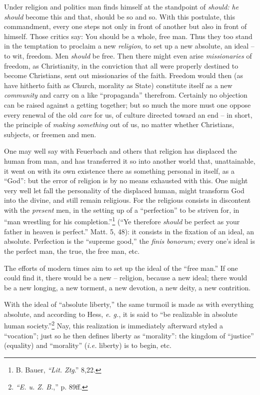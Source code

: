 \documentclass[12pt,a4paper]{book}
\begin{document}
Under religion and politics man finds himself at the standpoint of 
\textit{should: he should} become this and that, should be so and so. With 
this postulate, this commandment, every one steps not only in front of another 
but also in front of himself. Those critics say: You should be a whole, free 
man. Thus they too stand in the temptation to proclaim a new 
\textit{religion}, to set up a new absolute, an ideal -- to wit, freedom. Men 
\textit{should} be free. Then there might even arise \textit{missionaries} of 
freedom, as Christianity, in the conviction that all were properly destined to 
become Christians, sent out missionaries of the faith. Freedom would then (as 
have hitherto faith as Church, morality as State) constitute itself as a new 
\textit{community} and carry on a like ``propaganda'' therefrom. Certainly 
no objection can be raised against a getting together; but so much the more 
must one oppose every renewal of the old \textit{care} for us, of culture 
directed toward an end -- in short, the principle of \textit{making something} 
out of us, no matter whether Christians, subjects, or freemen and men.

One may well say with Feuerbach and others that religion has displaced the 
human from man, and has transferred it so into another world that, 
unattainable, it went on with its own existence there as something personal in 
itself, as a ``God'': but the error of religion is by no means exhausted 
with this. One might very well let fall the personality of the displaced 
human, might transform God into the divine, and still remain religious. For 
the religious consists in discontent with the \textit{present} men, in the 
setting up of a ``perfection'' to be striven for, in ``man wrestling for 
his completion.''\footnote{B. Bauer, \textit{``Lit. Ztg}.'' 8,22.} (``Ye 
therefore \textit{should} be perfect as your father in heaven is perfect.'' 
Matt. 5, 48): it consists in the fixation of an ideal, an absolute. Perfection 
is the ``supreme good,'' the \textit{finis bonorum;} every one's ideal is 
the perfect man, the true, the free man, etc.

The efforts of modern times aim to set up the ideal of the ``free man.'' If 
one could find it, there would be a new -- religion, because a new ideal; 
there would be a new longing, a new torment, a new devotion, a new deity, a 
new contrition.

With the ideal of ``absolute liberty,'' the same turmoil is made as with 
everything absolute, and according to Hess, \textit{e. g.}, it is said to 
``be realizable in absolute human society.''\footnote{\textit{``E. u. Z. 
B.},'' p. 89ff.} Nay, this realization is immediately afterward styled a 
``vocation''; just so he then defines liberty as ``morality'': the kingdom 
of ``justice'' (equality) and ``morality'' (\textit{i.e.} liberty) is to 
begin, etc.
\end{document}
